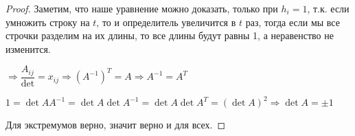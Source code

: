 \begin{proof}
    Заметим, что наше уравнение можно доказать, только при $h_i = 1$, т.к. если умножить строку на $t$, то и определитель увеличится в $t$ раз, тогда если мы все строчки разделим на их длины, то все длины будут равны 1, а неравенство не изменится.
    
    $\Rightarrow \dfrac{A_{ij}}{\det} = x_{ij} \Rightarrow (A^{-1})^T = A \Rightarrow A^{-1} = A^T$
    
    $1 = \det AA^{-1} = \det A \det A^{-1} = \det A \det A^T = (\det A)^2 \Rightarrow \det A = \pm 1$
    
    Для экстремумов верно, значит верно и для всех.
    
\end{proof}